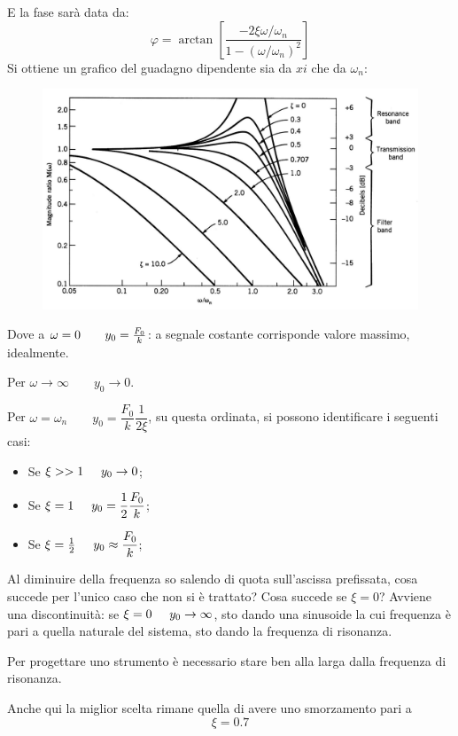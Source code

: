 \documentclass[a4paper, 15pt]{article}
\begin{document}
\begin{adjustwidth}{2in}{}
			E la fase sarà data da: 
			\[ \varphi = \arctan\left[\dfrac{-2\xi \omega/\omega_n}{1-(\omega/\omega_n)^2}\right]\]
			Si ottiene un grafico del guadagno dipendente sia da $xi$ che da $\omega_n$: 			
\begin{figure}[H]
	\centering
	\includegraphics[width=0.7\linewidth]{fig/imag6}
	\label{fig:imag6}
\end{figure}
			Dove a \(\omega = 0 \qquad y_0 = {F_0\over k}\): a segnale costante corrisponde valore massimo, idealmente. \newline
			
			Per \(\omega\rightarrow\infty \qquad y_0 \rightarrow 0\). \newline
			
			Per \( \omega = \omega_n \qquad y_0 = \dfrac{F_0}{k}\dfrac{1}{2\xi} \), su questa ordinata, si possono identificare i seguenti casi:
			\begin{itemize}
				\item Se \(\xi >> 1 \hspace{0.5cm} y_0 \rightarrow0\);
				\item Se \(\xi = 1 \hspace{0.5cm} y_0 = \dfrac{1}{2}\dfrac{F_0}{k}\);
				\item Se \(\xi = {1\over 2} \hspace{0.5cm} y_0 \approx \dfrac{F_0}{k}\);
			\end{itemize}
			Al diminuire della frequenza so salendo di quota sull'ascissa prefissata, cosa succede per l'unico caso che non si è trattato? Cosa succede se \(\xi = 0\)?
			Avviene una discontinuità: se \(\xi =0 \hspace{0.5cm} y_0 \rightarrow\infty\), sto dando una sinusoide la cui frequenza è pari a quella naturale del sistema, sto dando la frequenza di risonanza. 
			
			Per progettare uno strumento è necessario stare ben alla larga dalla frequenza di risonanza.
			
			Anche qui la miglior scelta rimane quella di avere uno smorzamento pari a
			\[\xi = 0.7\] 
\end{adjustwidth}
\newpage
\end{document}
